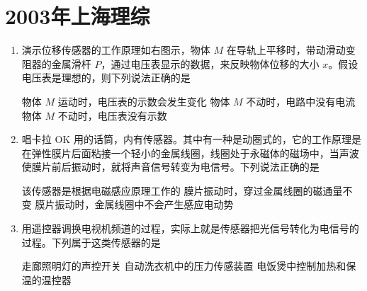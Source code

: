 \documentclass[\gkver]{gaokaozhenti}
\begin{document}
\chapter{2003年上海理综}

\begin{enumerate}
\item
演示位移传感器的工作原理如右图示，物体 $M$ 在导轨上平移时，带动滑动变阻器的金属滑杆 $P$，通过电压表显示的数据，来反映物体位移的大小 $x$。假设电压表是理想的，则下列说法正确的是


{物体 $M$ 运动时，电压表的示数会发生变化}
{物体 $M$ 不动时，电路中没有电流}
{物体 $M$ 不动时，电压表没有示数}


\item
唱卡拉 OK 用的话筒，内有传感器。其中有一种是动圈式的，它的工作原理是在弹性膜片后面粘接一个轻小的金属线圈，线圈处于永磁体的磁场中，当声波使膜片前后振动时，就将声音信号转变为电信号。下列说法正确的是

{该传感器是根据电磁感应原理工作的}
{膜片振动时，穿过金属线圈的磁通量不变}
{膜片振动时，金属线圈中不会产生感应电动势}


\item
用遥控器调换电视机频道的过程，实际上就是传感器把光信号转化为电信号的过程。下列属于这类传感器的是

{走廊照明灯的声控开关}
{自动洗衣机中的压力传感装置}
{电饭煲中控制加热和保温的温控器}



\end{enumerate}
\end{document}
